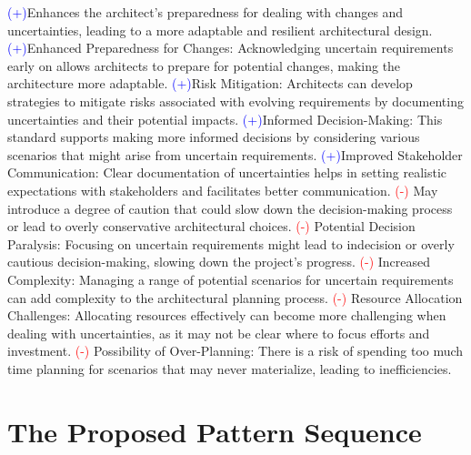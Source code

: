 \newline
\textcolor{blue}{(+)}Enhances the architect's preparedness for dealing with changes and uncertainties, leading to a more adaptable and resilient architectural design. \newline
\textcolor{blue}{(+)}Enhanced Preparedness for Changes: Acknowledging uncertain requirements early on allows architects to prepare for potential changes, making the architecture more adaptable. \newline
\textcolor{blue}{(+)}Risk Mitigation: Architects can develop strategies to mitigate risks associated with evolving requirements by documenting uncertainties and their potential impacts. \newline
\textcolor{blue}{(+)}Informed Decision-Making: This standard supports making more informed decisions by considering various scenarios that might arise from uncertain requirements. \newline
\textcolor{blue}{(+)}Improved Stakeholder Communication: Clear documentation of uncertainties helps in setting realistic expectations with stakeholders and facilitates better communication. \newline
\textcolor{red}{(-)} May introduce a degree of caution that could slow down the decision-making process or lead to overly conservative architectural choices. \newline
\textcolor{red}{(-)} Potential Decision Paralysis: Focusing on uncertain requirements might lead to indecision or overly cautious decision-making, slowing down the project's progress. \newline
\textcolor{red}{(-)} Increased Complexity: Managing a range of potential scenarios for uncertain requirements can add complexity to the architectural planning process. \newline
\textcolor{red}{(-)} Resource Allocation Challenges: Allocating resources effectively can become more challenging when dealing with uncertainties, as it may not be clear where to focus efforts and investment. \newline
\textcolor{red}{(-)} Possibility of Over-Planning: There is a risk of spending too much time planning for scenarios that may never materialize, leading to inefficiencies. \newline

\texttt{}



\newpage
\section{The Proposed Pattern Sequence} \label{sec:proposed-pattern-sequence}

